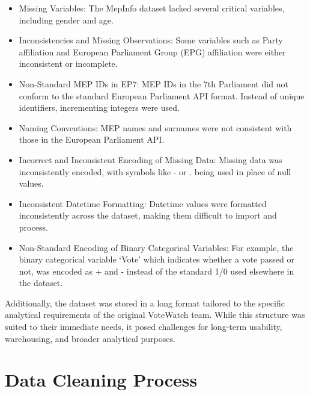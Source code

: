 \documentclass[a4paper,12pt]{report}
\begin{document}
            \begin{itemize}
                \item
                Missing Variables: The MepInfo dataset lacked several critical variables, including gender and age.
                \item
                Inconsistencies and Missing Observations: Some variables such as Party affiliation and European
                Parliament Group
                (EPG) affiliation were either inconsistent or incomplete.
                \item
                Non-Standard MEP IDs in EP7: MEP IDs in the 7th Parliament did not conform to the standard European
                Parliament
                API format.
                Instead of unique identifiers, incrementing integers were used.
                \item
                Naming Conventions: MEP names and surnames were not consistent with those in the European
                Parliament API.
                \item
                Incorrect and Inconsistent Encoding of Missing Data: Missing data was inconsistently encoded, with
                symbols like
                - or .
                being used in place of null values.
                \item
                Inconsistent Datetime Formatting: Datetime values were formatted inconsistently across the dataset,
                making them
                difficult to import and process.
                \item
                Non-Standard Encoding of Binary Categorical Variables: For example, the binary categorical variable
                `Vote'
                which indicates whether a vote passed or not, was encoded as + and - instead of the standard 1/0 used
                elsewhere
                in the dataset.
            \end{itemize}
            Additionally, the dataset was stored in a long format tailored to the specific analytical requirements of
            the
            original VoteWatch team.
            While this structure was suited to their immediate needs, it posed challenges for
            long-term
            usability, warehousing, and broader analytical purposes.


    \chapter{Data Cleaning Process}\label{ch:data-cleaning-process}
\end{document}
